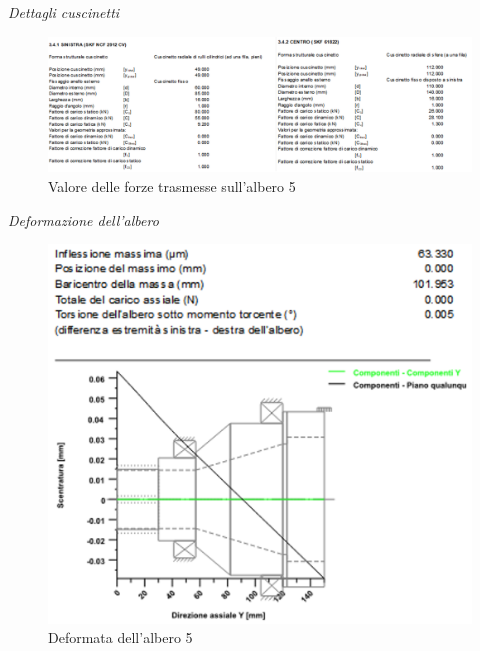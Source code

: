 \emph{Dettagli cuscinetti}
\begin{figure}[h]
    \centering
    \includegraphics[scale=0.5]{Immagini/ForzeCuscinettiAlbero5.png}
    \caption{Valore delle forze trasmesse sull'albero 5}
    \label{fig:ForzeCusinettiAlbero5}
\end{figure}
\newpage
\emph{Deformazione dell'albero}
\begin{figure}[h]
    \centering
    \includegraphics[scale=0.45]{Immagini/DeformataAlbero5.png}
        \caption{Deformata dell'albero 5}
    \label{fig:Deformataalbero5}
\end{figure}

